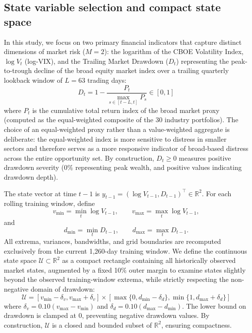 \documentclass[smallextended]{svjour3}
\begin{document}
\subsection{State variable selection and compact state space}
In this study, we focus on two primary financial indicators that capture distinct dimensions of market risk ($M = 2$): the logarithm of the CBOE Volatility Index, $\log V_t$ (log-VIX), and the Trailing Market Drawdown ($D_t$) representing the peak-to-trough decline of the broad equity market index over a trailing quarterly lookback window of $L = 63$ trading days:
\begin{equation}
    D_t = 1 - \frac{P_t}{\max_{s \in [t-L, t]} P_s} \in [0, 1]
\end{equation}
where $P_t$ is the cumulative total return index of the broad market proxy (computed as the equal-weighted composite of the 30 industry portfolios). The choice of an equal-weighted proxy rather than a value-weighted aggregate is deliberate: the equal-weighted index is more sensitive to distress in smaller sectors and therefore serves as a more responsive indicator of broad-based distress across the entire opportunity set. By construction, $D_t \ge 0$ measures positive drawdown severity ($0\%$ representing peak wealth, and positive values indicating drawdown depth).

The state vector at time $t-1$ is $y_{t-1} = (\log V_{t-1}, D_{t-1})^\top \in \mathbb{R}^2$. For each rolling training window, define
\begin{equation}
v_{\min}=\min_t \log V_{t-1},\qquad v_{\max}=\max_t \log V_{t-1},
\end{equation}
and
\begin{equation}
d_{\min}=\min_t D_{t-1},\qquad d_{\max}=\max_t D_{t-1}.
\end{equation}
All extrema, variances, bandwidths, and grid boundaries are recomputed exclusively from the current 1,260-day training window. We define the continuous state space $\mathcal{U} \subset \mathbb{R}^2$ as a compact rectangle containing all historically observed market states, augmented by a fixed 10\% outer margin to examine states slightly beyond the observed training-window extrema, while strictly respecting the non-negative domain of drawdown:
\begin{equation}
    \mathcal{U} = [v_{\min} - \delta_v, v_{\max} + \delta_v] \times [\max\{0, d_{\min} - \delta_d\}, \min\{1, d_{\max} + \delta_d\}]
\end{equation}
where $\delta_v = 0.10 (v_{\max} - v_{\min})$ and $\delta_d = 0.10 (d_{\max} - d_{\min})$. The lower bound on drawdown is clamped at 0, preventing negative drawdown values. By construction, $\mathcal{U}$ is a closed and bounded subset of $\mathbb{R}^2$, ensuring compactness.
\end{document}
